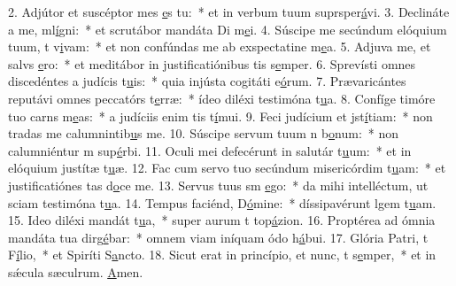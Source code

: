 2. Adjútor et suscéptor mes \uline{e}s tu:~* et in verbum tuum suprsper\uline{á}vi.
3. Declináte a me, ml\uline{í}gni:~* et scrutábor mandáta Di m\uline{e}i.
4. Súscipe me secúndum elóquium tuum, t v\uline{i}vam:~* et non confúndas me ab exspectatine m\uline{e}a.
5. Adjuva me, et salvs \uline{e}ro:~* et meditábor in justificatiónibus tis s\uline{e}mper.
6. Sprevísti omnes discedéntes a judícis t\uline{u}is:~* quia injústa cogitáti e\uline{ó}rum.
7. Prævaricántes reputávi omnes peccatórs t\uline{e}rræ:~* ídeo diléxi testimóna t\uline{u}a.
8. Confíge timóre tuo carns m\uline{e}as:~* a judíciis enim tis t\uline{í}mui.
9. Feci judícium et jst\uline{í}tiam:~* non tradas me calumnintib\uline{u}s me.
10. Súscipe servum tuum n b\uline{o}num:~* non calumniéntur m sup\uline{é}rbi.
11. Oculi mei defecérunt in salutár t\uline{u}um:~* et in elóquium justítæ t\uline{u}æ.
12. Fac cum servo tuo secúndum misericórdim t\uline{u}am:~* et justificatiónes tas d\uline{o}ce me.
13. Servus tuus sm \uline{e}go:~* da mihi intelléctum, ut sciam testimóna t\uline{u}a.
14. Tempus faciénd, D\uline{ó}mine:~* díssipavérunt lgem t\uline{u}am.
15. Ideo diléxi mandát t\uline{u}a,~* super aurum t top\uline{á}zion.
16. Proptérea ad ómnia mandáta tua dirg\uline{é}bar:~* omnem viam iníquam ódo h\uline{á}bui.
17. Glória Patri, t F\uline{í}lio,~* et Spiríti S\uline{a}ncto.
18. Sicut erat in princípio, et nunc, t s\uline{e}mper,~* et in sǽcula sæculrum. \uline{A}men.
